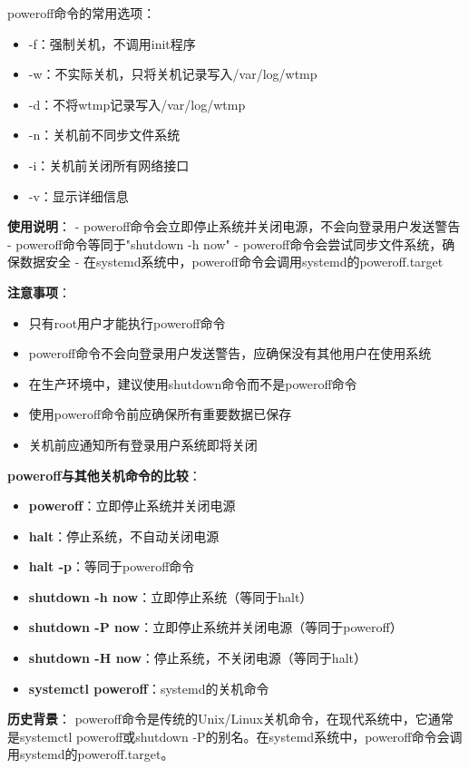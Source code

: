 \documentclass[12pt,UTF8]{ctexbook}
\begin{document}
poweroff命令的常用选项：
\begin{itemize}
    \item -f：强制关机，不调用init程序
    \item -w：不实际关机，只将关机记录写入/var/log/wtmp
    \item -d：不将wtmp记录写入/var/log/wtmp
    \item -n：关机前不同步文件系统
    \item -i：关机前关闭所有网络接口
    \item -v：显示详细信息
\end{itemize}

\textbf{使用说明}：
- poweroff命令会立即停止系统并关闭电源，不会向登录用户发送警告
- poweroff命令等同于"shutdown -h now"
- poweroff命令会尝试同步文件系统，确保数据安全
- 在systemd系统中，poweroff命令会调用systemd的poweroff.target

\textbf{注意事项}：
\begin{itemize}
    \item 只有root用户才能执行poweroff命令
    \item poweroff命令不会向登录用户发送警告，应确保没有其他用户在使用系统
    \item 在生产环境中，建议使用shutdown命令而不是poweroff命令
    \item 使用poweroff命令前应确保所有重要数据已保存
    \item 关机前应通知所有登录用户系统即将关闭
\end{itemize}

\textbf{poweroff与其他关机命令的比较}：
\begin{itemize}
    \item \textbf{poweroff}：立即停止系统并关闭电源
    \item \textbf{halt}：停止系统，不自动关闭电源
    \item \textbf{halt -p}：等同于poweroff命令
    \item \textbf{shutdown -h now}：立即停止系统（等同于halt）
    \item \textbf{shutdown -P now}：立即停止系统并关闭电源（等同于poweroff）
    \item \textbf{shutdown -H now}：停止系统，不关闭电源（等同于halt）
    \item \textbf{systemctl poweroff}：systemd的关机命令
\end{itemize}

\textbf{历史背景}：
poweroff命令是传统的Unix/Linux关机命令，在现代系统中，它通常是systemctl poweroff或shutdown -P的别名。在systemd系统中，poweroff命令会调用systemd的poweroff.target。
\end{document}
